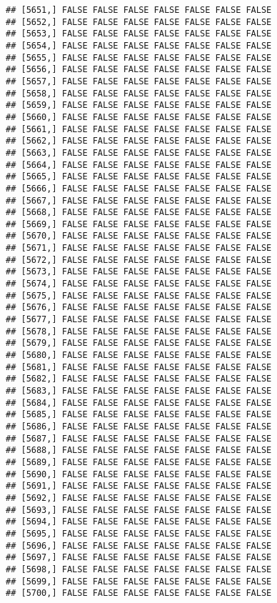 \documentclass[
]{article}
\begin{document}
\begin{verbatim}
## [5651,] FALSE FALSE FALSE FALSE FALSE FALSE FALSE
## [5652,] FALSE FALSE FALSE FALSE FALSE FALSE FALSE
## [5653,] FALSE FALSE FALSE FALSE FALSE FALSE FALSE
## [5654,] FALSE FALSE FALSE FALSE FALSE FALSE FALSE
## [5655,] FALSE FALSE FALSE FALSE FALSE FALSE FALSE
## [5656,] FALSE FALSE FALSE FALSE FALSE FALSE FALSE
## [5657,] FALSE FALSE FALSE FALSE FALSE FALSE FALSE
## [5658,] FALSE FALSE FALSE FALSE FALSE FALSE FALSE
## [5659,] FALSE FALSE FALSE FALSE FALSE FALSE FALSE
## [5660,] FALSE FALSE FALSE FALSE FALSE FALSE FALSE
## [5661,] FALSE FALSE FALSE FALSE FALSE FALSE FALSE
## [5662,] FALSE FALSE FALSE FALSE FALSE FALSE FALSE
## [5663,] FALSE FALSE FALSE FALSE FALSE FALSE FALSE
## [5664,] FALSE FALSE FALSE FALSE FALSE FALSE FALSE
## [5665,] FALSE FALSE FALSE FALSE FALSE FALSE FALSE
## [5666,] FALSE FALSE FALSE FALSE FALSE FALSE FALSE
## [5667,] FALSE FALSE FALSE FALSE FALSE FALSE FALSE
## [5668,] FALSE FALSE FALSE FALSE FALSE FALSE FALSE
## [5669,] FALSE FALSE FALSE FALSE FALSE FALSE FALSE
## [5670,] FALSE FALSE FALSE FALSE FALSE FALSE FALSE
## [5671,] FALSE FALSE FALSE FALSE FALSE FALSE FALSE
## [5672,] FALSE FALSE FALSE FALSE FALSE FALSE FALSE
## [5673,] FALSE FALSE FALSE FALSE FALSE FALSE FALSE
## [5674,] FALSE FALSE FALSE FALSE FALSE FALSE FALSE
## [5675,] FALSE FALSE FALSE FALSE FALSE FALSE FALSE
## [5676,] FALSE FALSE FALSE FALSE FALSE FALSE FALSE
## [5677,] FALSE FALSE FALSE FALSE FALSE FALSE FALSE
## [5678,] FALSE FALSE FALSE FALSE FALSE FALSE FALSE
## [5679,] FALSE FALSE FALSE FALSE FALSE FALSE FALSE
## [5680,] FALSE FALSE FALSE FALSE FALSE FALSE FALSE
## [5681,] FALSE FALSE FALSE FALSE FALSE FALSE FALSE
## [5682,] FALSE FALSE FALSE FALSE FALSE FALSE FALSE
## [5683,] FALSE FALSE FALSE FALSE FALSE FALSE FALSE
## [5684,] FALSE FALSE FALSE FALSE FALSE FALSE FALSE
## [5685,] FALSE FALSE FALSE FALSE FALSE FALSE FALSE
## [5686,] FALSE FALSE FALSE FALSE FALSE FALSE FALSE
## [5687,] FALSE FALSE FALSE FALSE FALSE FALSE FALSE
## [5688,] FALSE FALSE FALSE FALSE FALSE FALSE FALSE
## [5689,] FALSE FALSE FALSE FALSE FALSE FALSE FALSE
## [5690,] FALSE FALSE FALSE FALSE FALSE FALSE FALSE
## [5691,] FALSE FALSE FALSE FALSE FALSE FALSE FALSE
## [5692,] FALSE FALSE FALSE FALSE FALSE FALSE FALSE
## [5693,] FALSE FALSE FALSE FALSE FALSE FALSE FALSE
## [5694,] FALSE FALSE FALSE FALSE FALSE FALSE FALSE
## [5695,] FALSE FALSE FALSE FALSE FALSE FALSE FALSE
## [5696,] FALSE FALSE FALSE FALSE FALSE FALSE FALSE
## [5697,] FALSE FALSE FALSE FALSE FALSE FALSE FALSE
## [5698,] FALSE FALSE FALSE FALSE FALSE FALSE FALSE
## [5699,] FALSE FALSE FALSE FALSE FALSE FALSE FALSE
## [5700,] FALSE FALSE FALSE FALSE FALSE FALSE FALSE

\end{verbatim}
\end{document}
